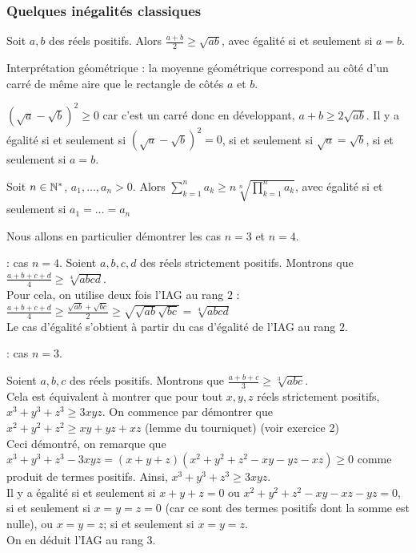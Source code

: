 \subsubsection{Quelques inégalités classiques}


\begin{pro}[Inégalité arithmético-géométrique, cas $n=2$]
Soit $a, b$ des réels positifs. Alors $\frac{a+b}2 \ge \sqrt{ab}$, avec égalité si et seulement si $a=b$.
\end{pro}

Interprétation géométrique : la moyenne géométrique correspond au côté d'un carré de même aire que le rectangle de côtés $a$ et $b$.

\begin{preuve}
$(\sqrt a-\sqrt b)^2 \ge 0$ car c'est un carré donc en développant, $a+b \ge 2\sqrt{ab}$. Il y a égalité si et seulement si $(\sqrt a - \sqrt b)^2 = 0$, si et seulement si $\sqrt a = \sqrt b$, si et seulement si $a=b$.
\end{preuve}

\begin{pro} 
Soit $n\in \mathbb N^*$, $a_1,\dots, a_n >0$. Alors $\sum_{k=1}^n a_k \ge n\sqrt[n]{\prod_{k=1}^na_k}$, avec égalité si et seulement si $a_1=\dots=a_n$
\end{pro}

Nous allons en particulier démontrer les cas $n=3$ et $n=4$.

\begin{preuve} : cas $n=4$.
Soient $a, b, c, d$ des réels strictement positifs. Montrons que $\frac{a+b+c+d}{4} \ge \sqrt[4]{abcd}$. \\ Pour cela, on utilise deux fois l'IAG au rang $2$ : $\frac{a+b+c+d}{4} \ge \frac{\sqrt{ab}+\sqrt{bc}}2 \ge \sqrt{\sqrt{ab}\sqrt{bc}} = \sqrt[4]{abcd}$\\ Le cas d'égalité s'obtient à partir du cas d'égalité de l'IAG au rang $2$.
\end{preuve}

\begin{preuve} : cas $n=3$.

Soient $a, b, c$ des réels positifs. Montrons que $\frac{a+b+c}{3} \ge \sqrt[3]{abc}$. \\ Cela est équivalent à montrer que pour tout $x, y,z$ réels strictement positifs, $x^3+y^3+z^3 \ge 3xyz$. On commence par démontrer que $x^2+y^2+z^2 \ge xy+yz+xz$ (lemme du tourniquet) (voir exercice 2)\\ Ceci démontré, on remarque que $x^3+y^3+z^3-3xyz = (x+y+z)(x^2+y^2+z^2-xy-yz-xz) \ge 0$ comme produit de termes positifs. Ainsi, $x^3+y^3+z^3 \ge 3xyz$. \\ Il y a égalité si et seulement si $x+y+z = 0$ ou $x^2+y^2+z^2 - xy-xz-yz = 0$, si et seulement si $x=y=z=0$ (car ce sont des termes positifs dont la somme est nulle), ou $x=y=z$; si et seulement si $x=y=z$. \\ On en déduit l'IAG au rang $3$.
\end{preuve}

